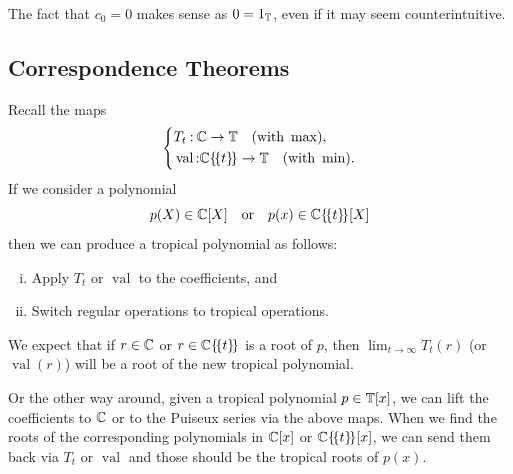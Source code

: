 \documentclass[12pt]{memoir}
\DeclareMathOperator{\val}{val}
\begin{document}
\begin{Rmk}
    The fact that $c_0=0$ makes sense as $0=1_{\mathbb{T}}$, even if it may seem counterintuitive.
\end{Rmk}

\subsection{Correspondence Theorems}%
Recall the maps
$$
\left\lbrace 
\begin{aligned}
    &T_t\: \bC\to\bT\quad(\text{with }\max),\\
    &\val\: \bC\{\!\{t\}\!\}\to\bT\quad(\text{with }\min).
\end{aligned}
\right.
$$
If we consider a polynomial 
$$p(X)\in\mathbb{C}[X]\quad\text{or}\quad p(x)\in\mathbb{C}\{\!\{t\}\!\}[X]$$
then we can produce a tropical polynomial as follows:

\begin{enumerate}[i.]
    \item Apply $T_t$ or $\val$ to the coefficients, and
    \item Switch regular operations to tropical operations.
\end{enumerate}

We expect that if $r\in\mathbb{C}$ or $r\in\mathbb{C}\{\!\{t\}\!\}$ is a root of $p$, then $\lim_{t\to\infty}T_t(r)$ (or $\val(r)$) will be a root of the new tropical polynomial.\par
Or the other way around, given a tropical polynomial $p\in\mathbb{T}[x]$, we can lift the coefficients to $\mathbb{C}$ or to the Puiseux series via the above maps. When we find the roots of the corresponding polynomials in $\mathbb{C}[x]$ or $\mathbb{C}\{\!\{t\}\!\}[x]$, we can send them back via $T_t$ or $\val$ and those should be the tropical roots of $p(x)$.
\end{document}
